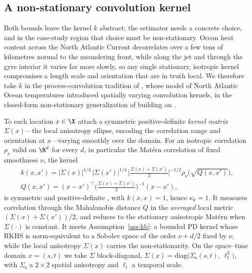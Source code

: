 \subsection{A non-stationary convolution kernel}
\label{sec:kb-kernel}

Both bounds leave the kernel $k$ abstract; the estimator needs a concrete choice,
and in the case-study region that choice must be non-stationary. Ocean heat content
across the North Atlantic Current decorrelates over a few tens of kilometres normal
to the meandering front, while along the jet and through the gyre interior it varies
far more slowly, so any single stationary, isotropic kernel compromises a length
scale and orientation that are in truth local. We therefore take $k$ in the
process-convolution tradition of \citet{higdon1998}, whose model of North Atlantic
Ocean temperatures introduced spatially varying convolution kernels, in the
closed-form non-stationary generalization of \citet{paciorek2006} building on
\citet{higdon1999}.

To each location $x\in\X$ attach a symmetric positive-definite \emph{kernel matrix}
$\Sigma(x)$---the local anisotropy ellipse, encoding the correlation range and
orientation at $x$---varying smoothly over the domain. For an isotropic correlation
$\rho_\nu$ valid on $\R^d$ for every $d$, in particular the Mat\'ern correlation of
fixed smoothness $\nu$, the kernel
\[
\begin{gathered}
  k(x,x')
  = |\Sigma(x)|^{1/4}\,|\Sigma(x')|^{1/4}\,
    \Big|\tfrac{\Sigma(x)+\Sigma(x')}{2}\Big|^{-1/2}
    \rho_\nu\!\big(\sqrt{Q(x,x')}\big),\\[2pt]
  Q(x,x')=(x-x')^{\!\top}\Big(\tfrac{\Sigma(x)+\Sigma(x')}{2}\Big)^{-1}(x-x') ,
\end{gathered}
\]
is symmetric and positive-definite \citep[Theorem~1]{paciorek2006}, with $k(x,x)=1$,
hence $\kappa_k=1$. It measures correlation through the Mahalanobis distance $Q$ in
the \emph{averaged} local metric $(\Sigma(x)+\Sigma(x'))/2$, and reduces to the
stationary anisotropic Mat\'ern when $\Sigma(\cdot)$ is constant. It meets
Assumption~\ref{ass:kb}: a bounded PD kernel whose RKHS is norm-equivalent to a
Sobolev space of the order $\nu+d/2$ fixed by $\nu$, while the local anisotropy
$\Sigma(x)$ carries the non-stationarity. On the space--time domain $x=(s,t)$ we
take $\Sigma$ block-diagonal, $\Sigma(x)=\mathrm{diag}\big(\Sigma_{\mathrm s}(s,t),\,\ell_t^2\big)$,
with $\Sigma_{\mathrm s}$ a $2\times2$ spatial anisotropy and $\ell_t$ a temporal
scale.

